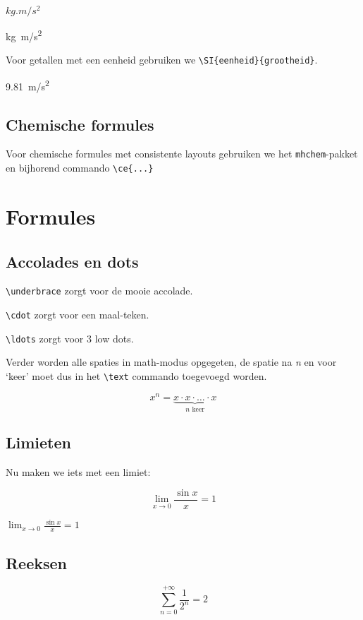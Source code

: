 \documentclass{article}
\begin{document}
	 \(kg.m/s^2\)
	 
	 \si{kg.m/s^2}
	 
	 Voor getallen met een eenheid gebruiken we \verb*|\SI{eenheid}{grootheid}|.
	 
	 \SI{9.81}{m/s^2}
	 
	 \subsection{Chemische formules}
	 
	 Voor chemische formules met consistente layouts gebruiken we het \texttt{mhchem}-pakket en bijhorend commando \verb*|\ce{...}|
	 
	 
	 \newpage
	 
	 \section{Formules}
	 
	 \subsection{Accolades en dots}
	 
	 \verb*|\underbrace| zorgt voor de mooie accolade.
	 
	 \verb*|\cdot| zorgt voor een maal-teken.
	 
	 \verb*|\ldots| zorgt voor 3 low dots.
	 
	Verder worden alle spaties in math-modus opgegeten, de spatie na \textit{n} en voor `keer' moet dus in het \verb*|\text| commando toegevoegd worden.
	 
	 \[x^n = \underbrace{x \cdot x \cdot \ldots \cdot x}_{n \text{ keer}}\]
	 
	 \subsection{Limieten}
	 
	 Nu maken we iets met een limiet:
	 
	 \[\lim_{x\to0} \frac{\sin x}{x} = 1\]
	 
	 \(\lim_{x\to0} \frac{\sin x}{x} = 1\)
	 
	 \subsection{Reeksen}
	 
	 \[\sum_{n=0}^{+\infty}\frac{1}{2^n} = 2 \]
	 
\end{document}
